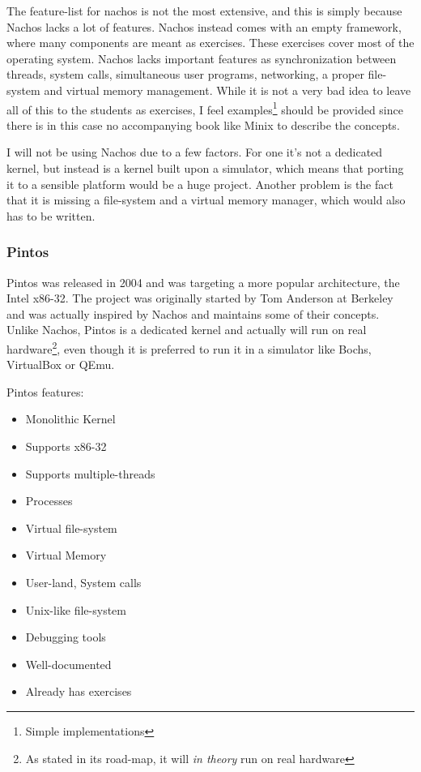 The feature-list for nachos is not the most extensive, and this is simply because Nachos lacks a lot of features. Nachos instead comes with an empty framework, where many components are  meant as exercises. These exercises cover most of the operating system. Nachos lacks important features as synchronization between threads, system calls, simultaneous user programs, networking, a proper file-system and virtual memory management. While it is not a very bad idea to leave all of this to the students as exercises, I feel examples\footnote{Simple implementations} should be provided since there is in this case no accompanying book like Minix to describe the concepts.

I will not be using Nachos due to a few factors. For one it's not a dedicated kernel, but instead is a kernel built upon a simulator, which means that porting it to a sensible platform would be a huge project. Another problem is the fact that it is missing a file-system and a virtual memory manager, which would also has to be written. 

\subsubsection{Pintos}

Pintos was released in 2004 and was targeting a more popular architecture, the Intel x86-32. The project was originally started by Tom Anderson at Berkeley and was actually inspired by Nachos and maintains some of their concepts. Unlike Nachos, Pintos is a dedicated kernel and actually will run on real hardware\footnote{As stated in its road-map, it will \emph{in theory} run on real hardware}, even though it is preferred to run it in a simulator like Bochs, VirtualBox or QEmu.

Pintos features\cite{PintosRef}:

\begin{itemize}
  \item Monolithic Kernel
  \item Supports x86-32
  \item Supports multiple-threads
  \item Processes
  \item Virtual file-system
  \item Virtual Memory
  \item User-land, System calls
  \item Unix-like file-system
  \item Debugging tools
  \item Well-documented
  \item Already has exercises
\end{itemize}

